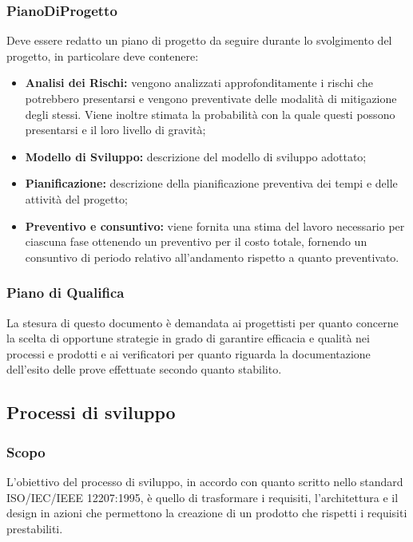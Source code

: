 \subsubsection{PianoDiProgetto}
Deve essere redatto un piano di progetto da seguire durante lo svolgimento del progetto, in particolare deve contenere:

\begin{itemize}
  \item \textbf{Analisi dei Rischi:} vengono analizzati approfonditamente i rischi che potrebbero presentarsi e vengono preventivate delle modalità di mitigazione degli stessi. Viene inoltre stimata la probabilità con la quale questi possono presentarsi e il loro livello di gravità;
  \item \textbf{Modello di Sviluppo:} descrizione del modello di sviluppo adottato;
  \item \textbf{Pianificazione:} descrizione della pianificazione preventiva dei tempi e delle attività del progetto;
  \item \textbf{Preventivo e consuntivo:}  viene fornita una stima del lavoro necessario per ciascuna fase ottenendo un preventivo per il costo totale,  fornendo un consuntivo di periodo relativo all'andamento rispetto a quanto preventivato.
\end{itemize}

\subsubsection{Piano di Qualifica}
\label{_pianoDiQualifica}
La stesura di questo documento è demandata ai progettisti per quanto concerne la scelta di opportune strategie in grado di garantire efficacia e qualità nei processi e prodotti e ai verificatori per quanto riguarda la documentazione dell'esito delle prove effettuate secondo quanto stabilito.


\subsection{Processi di sviluppo}
\label{_processiDiSviluppo}
\subsubsection{Scopo}

L'obiettivo del processo di sviluppo, in accordo con quanto scritto nello standard ISO/IEC/IEEE 12207:1995, è quello di trasformare i requisiti, l'architettura e il design in azioni che permettono la creazione di un prodotto che rispetti i requisiti prestabiliti.

